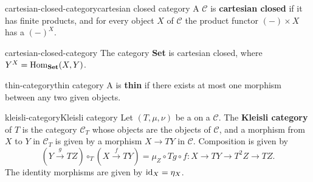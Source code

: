 \begin{topic}{cartesian-closed-category}{cartesian closed category}
    A  $\mathcal{C}$ is \textbf{cartesian closed} if it has finite products, and for every object $X$ of $\mathcal{C}$ the product functor $(-) \times X$ has a  $(-)^X$.
\end{topic}

\begin{example}{cartesian-closed-category}
    The category \textbf{Set} is cartesian closed, where $Y^X = \text{Hom}_\textbf{Set}(X, Y)$.
\end{example}

\begin{topic}{thin-category}{thin category}
    A  is \textbf{thin} if there exists at most one morphism between any two given objects.
\end{topic}


\begin{topic}{kleisli-category}{Kleisli category}
    Let $(T, \mu, \nu)$ be a  on a  $\mathcal{C}$. The \textbf{Kleisli category} of $T$ is the category $\mathcal{C}_T$ whose objects are the objects of $\mathcal{C}$, and a morphism from $X$ to $Y$ in $\mathcal{C}_T$ is given by a morphism $X \to TY$ in $\mathcal{C}$. Composition is given by
    \[ (Y \xrightarrow{g} TZ) \circ_T (X \xrightarrow{f} TY) = \mu_Z \circ Tg \circ f : X \to TY \to T^2 Z \to TZ . \]
    The identity morphisms are given by $\text{id}_X = \eta_X$.
\end{topic}

